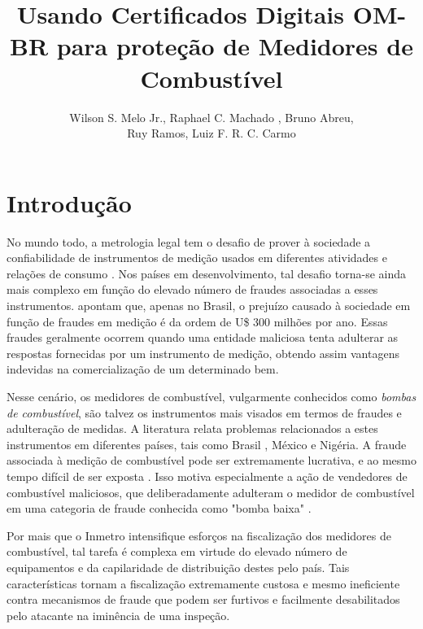 \documentclass[12pt]{article}
\title{Usando Certificados Digitais OM-BR para proteção de Medidores de Combustível}
\author{
  Wilson S. Melo Jr.\inst{1}, Raphael C. Machado \inst{1}, Bruno Abreu\inst{1},\\ 
  Ruy Ramos\inst{2}, Luiz F. R. C. Carmo\inst{1,3}}
\begin{document}
 

\maketitle

     

\section{Introdução}
No mundo todo, a metrologia legal tem o desafio de prover à sociedade a confiabilidade de instrumentos de medição usados em diferentes atividades e relações de consumo \cite{RodriguesFilho2015}.
Nos países em desenvolvimento, tal desafio torna-se ainda mais complexo em função do elevado número de fraudes associadas a esses instrumentos.
\cite{RodriguesFilho2016} apontam que, apenas no Brasil, o prejuízo causado à sociedade em função de fraudes em medição é da ordem de U\$ 300 milhões por ano.
Essas fraudes geralmente ocorrem quando uma entidade maliciosa tenta adulterar as respostas fornecidas por um instrumento de medição, obtendo assim vantagens indevidas na comercialização de um determinado bem.

Nesse cenário, os medidores de combustível, vulgarmente conhecidos como \emph{bombas de combustível}, são talvez os instrumentos mais visados em termos de fraudes e adulteração de medidas.
A literatura relata problemas relacionados a estes instrumentos em diferentes países, tais como Brasil \cite{Leitao2014a,Beteto2016}, México \cite{Luchsinger2008} e Nigéria\cite{Rasheed2017}.
A fraude associada à medição de combustível pode ser extremamente lucrativa, e ao mesmo tempo difícil de ser exposta \cite{Leitao2014a,Beteto2016}.
Isso motiva especialmente a ação de vendedores de combustível maliciosos, que deliberadamente adulteram o medidor de combustível em uma categoria de fraude conhecida como "bomba baixa" \cite{Beteto2016}.

Por mais que o Inmetro intensifique esforços na fiscalização dos medidores de combustível, tal tarefa é complexa em virtude do elevado número de equipamentos e da capilaridade de distribuição destes pelo país.
Tais características tornam a fiscalização extremamente custosa e mesmo ineficiente contra mecanismos de fraude que podem ser furtivos e facilmente desabilitados pelo atacante na iminência de uma inspeção.
\end{document}
